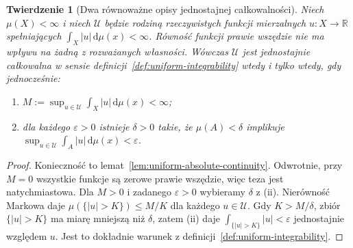 \documentclass[11pt,a4paper,oneside]{book}
\numberwithin{equation}{chapter}
\theoremstyle{plain}
\newtheorem{twierdzenie}{Twierdzenie}[chapter]
\theoremstyle{definition}
\theoremstyle{remark}
\begin{document}
\begin{twierdzenie}[Dwa równoważne opisy jednostajnej całkowalności]
\label{thm:ui-two-criteria-8}
Niech $\mu(X)<\infty$ i niech $\mathcal U$ będzie
rodziną rzeczywistych funkcji mierzalnych $u:X\to\mathbb R$
spełniających $\int_X|u|\,\mathrm d\mu(x)<\infty$.
Równość funkcji prawie wszędzie nie ma wpływu
na żadną z rozważanych własności.
Wówczas $\mathcal U$ jest jednostajnie całkowalna
w sensie definicji~\ref{def:uniform-integrability}
wtedy i tylko wtedy, gdy jednocześnie:
\begin{enumerate}[label=\textup{(\roman*)}]
\item $M:=\sup_{u\in\mathcal U}\int_X|u|\,\mathrm d\mu(x)<\infty$;
\item dla każdego $\varepsilon>0$ istnieje $\delta>0$
takie, że $\mu(A)<\delta$ implikuje
$\sup_{u\in\mathcal U}\int_A|u|\,\mathrm d\mu(x)<\varepsilon$.
\end{enumerate}
\end{twierdzenie}
\begin{proof}
Konieczność to lemat~\ref{lem:uniform-absolute-continuity}.
Odwrotnie, przy $M=0$ wszystkie funkcje są zerowe
prawie wszędzie, więc teza jest natychmiastowa.
Dla $M>0$ i zadanego $\varepsilon>0$ wybieramy
$\delta$ z (ii). Nierówność Markowa daje
$\mu(\{|u|>K\})\le M/K$ dla każdego $u\in\mathcal U$.
Gdy $K>M/\delta$, zbiór $\{|u|>K\}$ ma miarę
mniejszą niż $\delta$, zatem (ii) daje
$\int_{\{|u|>K\}}|u|<\varepsilon$ jednostajnie
względem $u$. Jest to dokładnie warunek z
definicji~\ref{def:uniform-integrability}.
\end{proof}
\end{document}
